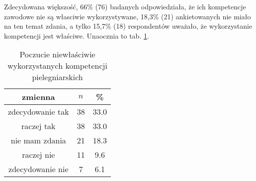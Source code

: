 

Zdecydowana większość, 66\% (76) badanych odpowiedziała, że ich kompetencje zawodowe nie są własciwie wykorzystywane, 18,3\% (21) ankietowanych nie miało na ten temat zdania, a tylko 15,7\% (18)  respondentów uważało, że wykorzystanie kompetencji jest właściwe. Unaocznia to tab. \ref{tab:Q21}.



\begin{table}[H]
\caption{Poczucie niewłaściwie wykorzystanych kompetencji pielegniarskich}
\centering
\begin{tabular}{ | c | c | c |}
\hline
zmienna & $n$ & \% \\
\hline
zdecydowanie tak  &  38  & 33.0 \\
\hline
raczej tak  &  38  & 33.0\\
\hline
nie mam zdania  &  21  & 18.3 \\
\hline
raczej nie  &  11  & 9.6 \\
\hline
zdecydowanie nie  &  7  & 6.1\\
\hline
\end{tabular}
\label{tab:Q21}
\end{table}
